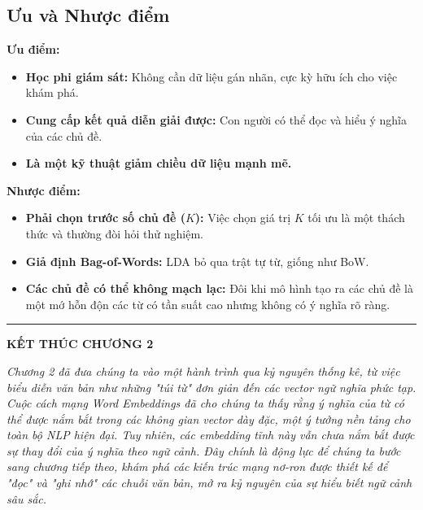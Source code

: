 \subsection{Ưu và Nhược điểm}
\begin{tcolorbox}[
    title=Đánh giá mô hình LDA,
    colback=blue!5!white, colframe=blue!50!black, fonttitle=\bfseries
]
\textbf{Ưu điểm:}
\begin{itemize}
    \item \textbf{Học phi giám sát:} Không cần dữ liệu gán nhãn, cực kỳ hữu ích cho việc khám phá.
    \item \textbf{Cung cấp kết quả diễn giải được:} Con người có thể đọc và hiểu ý nghĩa của các chủ đề.
    \item \textbf{Là một kỹ thuật giảm chiều dữ liệu mạnh mẽ.}
\end{itemize}
\textbf{Nhược điểm:}
\begin{itemize}
    \item \textbf{Phải chọn trước số chủ đề ($K$):} Việc chọn giá trị $K$ tối ưu là một thách thức và thường đòi hỏi thử nghiệm.
    \item \textbf{Giả định Bag-of-Words:} LDA bỏ qua trật tự từ, giống như BoW.
    \item \textbf{Các chủ đề có thể không mạch lạc:} Đôi khi mô hình tạo ra các chủ đề là một mớ hỗn độn các từ có tần suất cao nhưng không có ý nghĩa rõ ràng.
\end{itemize}
\end{tcolorbox}

\bigskip
\hrule
\bigskip

\begin{center}
    \textbf{\Large KẾT THÚC CHƯƠNG 2}
\end{center}

\textit{Chương 2 đã đưa chúng ta vào một hành trình qua kỷ nguyên thống kê, từ việc biểu diễn văn bản như những "túi từ" đơn giản đến các vector ngữ nghĩa phức tạp. Cuộc cách mạng Word Embeddings đã cho chúng ta thấy rằng ý nghĩa của từ có thể được nắm bắt trong các không gian vector dày đặc, một ý tưởng nền tảng cho toàn bộ NLP hiện đại. Tuy nhiên, các embedding tĩnh này vẫn chưa nắm bắt được sự thay đổi của ý nghĩa theo ngữ cảnh. Đây chính là động lực để chúng ta bước sang chương tiếp theo, khám phá các kiến trúc mạng nơ-ron được thiết kế để "đọc" và "ghi nhớ" các chuỗi văn bản, mở ra kỷ nguyên của sự hiểu biết ngữ cảnh sâu sắc.}